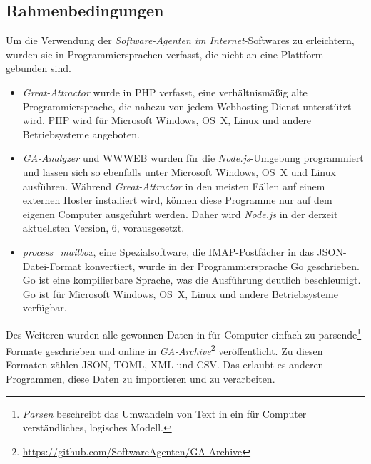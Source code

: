\subsection{Rahmenbedingungen}
\label{sub:forschung_rahmenbedingungen}

Um die Verwendung der \emph{Software-Agenten im Internet}-Softwares zu
erleichtern, wurden sie in Programmiersprachen verfasst, die nicht an eine
Plattform gebunden sind.

\begin{itemize}
\item
  \emph{Great-Attractor} wurde in PHP verfasst, eine verhältnismäßig alte
  Programmiersprache, die nahezu von jedem Webhosting-Dienst unterstützt wird.
  PHP wird für Microsoft Windows, OS~X, Linux und andere Betriebsysteme
  angeboten.
\item
  \emph{GA-Analyzer} und WWWEB wurden für die \emph{Node.js}-Umgebung
  programmiert und lassen sich so ebenfalls unter Microsoft Windows, OS~X und
  Linux ausführen. Während \emph{Great-Attractor} in den meisten Fällen auf
  einem externen Hoster installiert wird, können diese Programme nur auf dem
  eigenen Computer ausgeführt werden. Daher wird \emph{Node.js} in der derzeit
  aktuellsten Version, 6, vorausgesetzt.
\item
  \emph{process\_mailbox}, eine Spezialsoftware, die IMAP-Postfächer in das
  JSON-Datei-Format konvertiert, wurde in der Programmiersprache Go
  geschrieben. Go ist eine kompilierbare Sprache, was die Ausführung deutlich
  beschleunigt. Go ist für Microsoft Windows, OS~X, Linux und andere
  Betriebsysteme verfügbar.
\end{itemize}

Des Weiteren wurden alle gewonnen Daten in für Computer einfach zu
parsende\footnote{\emph{Parsen} beschreibt das Umwandeln von Text in ein für
Computer verständliches, logisches Modell.} Formate geschrieben und online in
\emph{GA-Archive}\footnote{\url{https://github.com/SoftwareAgenten/GA-Archive}}
veröffentlicht. Zu diesen Formaten zählen JSON, TOML, XML und CSV. Das erlaubt
es anderen Programmen, diese Daten zu importieren und zu verarbeiten.
